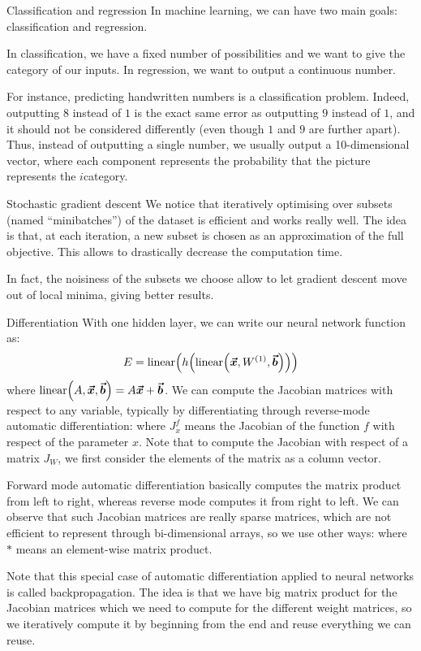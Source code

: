 \documentclass[a4paper]{article}
\begin{document}
\begin{parag}{Classification and regression}
    In machine learning, we can have two main goals: classification and regression.

    In classification, we have a fixed number of possibilities and we want to give the category of our inputs. In regression, we want to output a continuous number.

    For instance, predicting handwritten numbers is a classification problem. Indeed, outputting $8$ instead of $1$ is the exact same error as outputting $9$ instead of $1$, and it should not be considered differently (even though $1$ and $9$ are further apart). Thus, instead of outputting a single number, we usually output a 10-dimensional vector, where each component represents the probability that the picture represents the $i$\Th category.
\end{parag}

\begin{parag}{Stochastic gradient descent}
    We notice that iteratively optimising over subsets (named ``minibatches'') of the dataset is efficient and works really well. The idea is that, at each iteration, a new subset is chosen as an approximation of the full objective. This allows to drastically decrease the computation time.

    In fact, the noisiness of the subsets we choose allow to let gradient descent move out of local minima, giving better results.
\end{parag}

\begin{parag}{Differentiation}
    With one hidden layer, we can write our neural network function as: 
    \[E = \text{linear}\left(h\left(\text{linear}\left(\bvec{x}, W^{\left(1\right)}, \bvec{b}\right)\right)\right)\]
    where $\text{linear}\left(A, \bvec{x}, \bvec{b}\right) = A \bvec{x} + \bvec{b}$. We can compute the Jacobian matrices with respect to any variable, typically by differentiating through reverse-mode automatic differentiation:
    where $J_{x}^f$ means the Jacobian of the function $f$ with respect of the parameter $x$. Note that to compute the Jacobian with respect of a matrix $J_W$, we first consider the elements of the matrix as a column vector.

    Forward mode automatic differentiation basically computes the matrix product from left to right, whereas reverse mode computes it from right to left. We can observe that such Jacobian matrices are really sparse matrices, which are not efficient to represent through bi-dimensional arrays, so we use other ways:
    where $*$ means an element-wise matrix product.

    Note that this special case of automatic differentiation applied to neural networks is called backpropagation. The idea is that we have big matrix product for the Jacobian matrices which we need to compute for the different weight matrices, so we iteratively compute it by beginning from the end and reuse everything we can reuse.
\end{parag}
\end{document}
